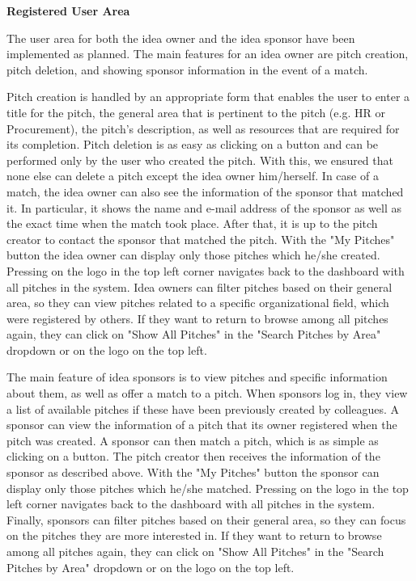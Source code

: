 \textbf{Registered User Area}

The user area for both the idea owner and the idea sponsor have been implemented as planned. The main features for an idea owner are pitch creation, pitch deletion, and showing sponsor information in the event of a match.

Pitch creation is handled by an appropriate form that enables the user to enter a title for the pitch, the general area that is pertinent to the pitch (e.g. HR or Procurement), the pitch’s description, as well as resources that are required for its completion.
Pitch deletion is as easy as clicking on a button and can be performed only by the user who created the pitch. With this, we ensured that none else can delete a pitch except the idea owner him/herself.
In case of a match, the idea owner can also see the information of the sponsor that matched it. In particular, it shows the name and e-mail address of the sponsor as well as the exact time when the match took place. After that, it is up to the pitch creator to contact the sponsor that matched the pitch.
With the "My Pitches" button the idea owner can display only those pitches which he/she created. Pressing on the logo in the top left corner navigates back to the dashboard with all pitches in the system.
Idea owners can filter pitches based on their general area, so they can view pitches related to a specific organizational field, which were registered by others. If they want to return to browse among all pitches again, they can click on "Show All Pitches" in the "Search Pitches by Area" dropdown or on the logo on the top left.

The main feature of idea sponsors is to view pitches and specific information about them, as well as offer a match to a pitch. When sponsors log in, they view a list of available pitches if these have been previously created by colleagues.
A sponsor can view the information of a pitch that its owner registered when the pitch was created. A sponsor can then match a pitch, which is as simple as clicking on a button. The pitch creator then receives the information of the sponsor as described above.
With the "My Pitches" button the sponsor can display only those pitches which he/she matched. Pressing on the logo in the top left corner navigates back to the dashboard with all pitches in the system.
Finally, sponsors can filter pitches based on their general area, so they can focus on the pitches they are more interested in. If they want to return to browse among all pitches again, they can click on "Show All Pitches" in the "Search Pitches by Area" dropdown or on the logo on the top left.


